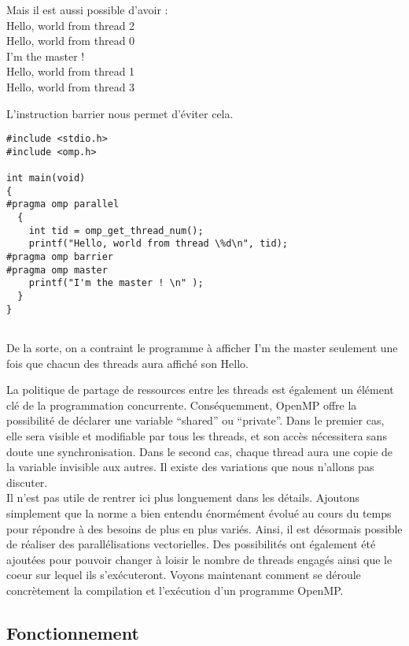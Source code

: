 \documentclass{report}
\begin{document}
Mais il est aussi possible d'avoir :
\\Hello, world from thread 2
\\Hello, world from thread 0
\\ I'm the master ! 
\\Hello, world from thread 1
\\Hello, world from thread 3

 L'instruction barrier nous permet d'éviter cela.
\begin{lstlisting}
#include <stdio.h>
#include <omp.h>

int main(void)
{
#pragma omp parallel
  {
    int tid = omp_get_thread_num();
    printf("Hello, world from thread \%d\n", tid);
#pragma omp barrier
#pragma omp master
    printf("I'm the master ! \n" );
  }
}


\end{lstlisting}

De la sorte, on a contraint le programme à afficher I'm the master seulement une fois que chacun 
des threads aura affiché son Hello.

La politique de partage de ressources entre les threads est également un élément clé de la programmation
concurrente. Conséquemment, OpenMP offre la possibilité de déclarer une variable ``shared'' ou ``private''.
Dans le premier cas, elle sera visible et modifiable par tous les threads, et son accès nécessitera sans
doute une synchronisation. Dans le second cas, chaque thread aura une copie de la variable invisible aux 
autres. Il existe des variations que nous n'allons pas discuter.
\\Il n'est pas utile de rentrer ici plus longuement dans les détails. Ajoutons simplement que la
norme a bien entendu énormément évolué au cours du temps pour répondre à des besoins de plus en plus
variés. Ainsi, il est désormais possible de réaliser des parallélisations vectorielles. Des possibilités
ont également été ajoutées pour pouvoir changer à loisir le nombre de threads engagés ainsi que le coeur 
sur lequel ils s'exécuteront. Voyons maintenant comment se déroule concrètement la compilation et
l'exécution d'un programme OpenMP.

\subsection{Fonctionnement}
\end{document}
